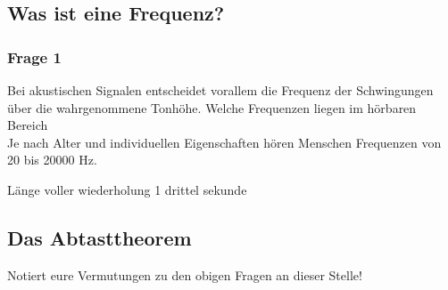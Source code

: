 \documentclass[a4paper, 11pt]{article}
\begin{document}
    \subsection{Was ist eine Frequenz?}
    
    \subsubsection{Frage 1}
    Bei akustischen Signalen entscheidet vorallem die Frequenz der Schwingungen über die wahrgenommene Tonhöhe. 
    Welche Frequenzen liegen im hörbaren Bereich\\
    Je nach Alter und individuellen Eigenschaften hören Menschen Frequenzen von 20 bis 20000 Hz.


    Länge voller wiederholung 1 drittel sekunde 

    \subsection{Das Abtasttheorem}
    Notiert eure Vermutungen zu den obigen Fragen an dieser Stelle!
\end{document}
